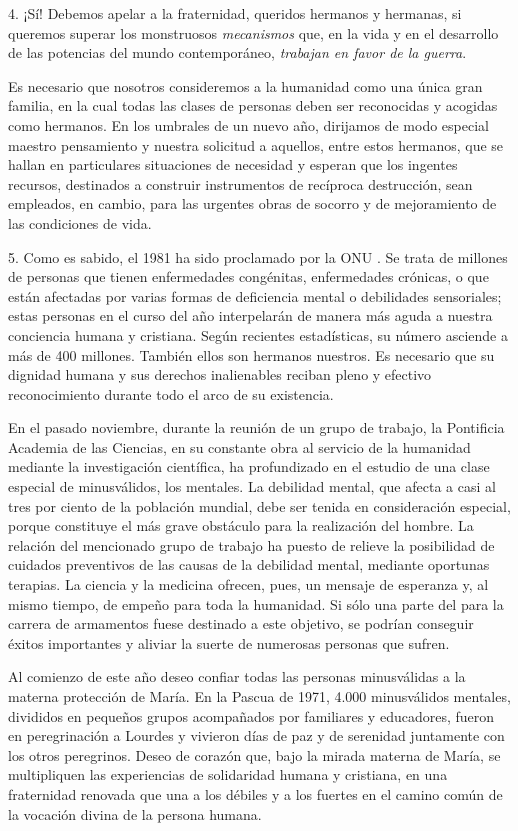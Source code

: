 \begin{body}
\begin{body}
4. ¡Sí! Debemos apelar a la fraternidad, queridos hermanos y hermanas, si queremos superar los monstruosos \emph{mecanismos} que, en la vida y en el desarrollo de las potencias del mundo contemporáneo, \emph{trabajan en favor de la guerra}.

Es necesario que nosotros consideremos a la humanidad como una única gran familia, en la cual todas las clases de personas deben ser reconocidas y acogidas como hermanos. En los umbrales de un nuevo año, dirijamos de modo especial maestro pensamiento y nuestra solicitud a aquellos, entre estos hermanos, que se hallan en particulares situaciones de necesidad y esperan que los ingentes recursos, destinados a construir instrumentos de recíproca destrucción, sean empleados, en cambio, para las urgentes obras de socorro y de mejoramiento de las condiciones de vida.

5. Como es sabido, el 1981 ha sido proclamado por la ONU . Se trata de millones de personas que tienen enfermedades congénitas, enfermedades crónicas, o que están afectadas por varias formas de deficiencia mental o debilidades sensoriales; estas personas en el curso del año interpelarán de manera más aguda a nuestra conciencia humana y cristiana. Según recientes estadísticas, su número asciende a más de 400 millones. También ellos son hermanos nuestros. Es necesario que su dignidad humana y sus derechos inalienables reciban pleno y efectivo reconocimiento durante todo el arco de su existencia.

En el pasado noviembre, durante la reunión de un grupo de trabajo, la Pontificia Academia de las Ciencias, en su constante obra al servicio de la humanidad mediante la investigación científica, ha profundizado en el estudio de una clase especial de minusválidos, los mentales. La debilidad mental, que afecta a casi al tres por ciento de la población mundial, debe ser tenida en consideración especial, porque constituye el más grave obstáculo para la realización del hombre. La relación del mencionado grupo de trabajo ha puesto de relieve la posibilidad de cuidados preventivos de las causas de la debilidad mental, mediante oportunas terapias. La ciencia y la medicina ofrecen, pues, un mensaje de esperanza y, al mismo tiempo, de empeño para toda la humanidad. Si sólo una parte del  para la carrera de armamentos fuese destinado a este objetivo, se podrían conseguir éxitos importantes y aliviar la suerte de numerosas personas que sufren.

Al comienzo de este año deseo confiar todas las personas minusválidas a la materna protección de María. En la Pascua de 1971, 4.000 minusválidos mentales, divididos en pequeños grupos acompañados por familiares y educadores, fueron en peregrinación a Lourdes y vivieron días de paz y de serenidad juntamente con los otros peregrinos. Deseo de corazón que, bajo la mirada materna de María, se multipliquen las experiencias de solidaridad humana y cristiana, en una fraternidad renovada que una a los débiles y a los fuertes en el camino común de la vocación divina de la persona humana.


\end{body}
\end{body}
